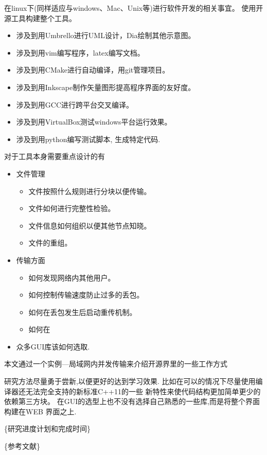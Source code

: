 \documentclass{data/hbue}
\begin{document}
\reportcontent
{
在linux下(同样适应与windows、Mac、Unix等)进行软件开发的相关事宜。
使用开源工具构建整个工具。
\begin{itemize}
	\item 涉及到用Umbrello进行UML设计，Dia绘制其他示意图。
	\item 涉及到用vim编写程序，latex编写文档。
	\item 涉及到用CMake进行自动编译，用git管理项目。
	\item 涉及到用Inkscape制作矢量图形提高程序界面的友好度。
	\item 涉及到用GCC进行跨平台交叉编译。
	\item 涉及到用VirtualBox测试windows平台运行效果。
	\item 涉及到用python编写测试脚本, 生成特定代码.
\end{itemize}

对于工具本身需要重点设计的有
\begin{itemize}
	\item 文件管理
		\begin{itemize}
			\item 文件按照什么规则进行分块以便传输。
			\item 文件如何进行完整性检验。
			\item 文件信息如何组织以便其他节点知晓。
			\item 文件的重组。
		\end{itemize}
	\item 传输方面
		\begin{itemize}
			\item 如何发现网络内其他用户。
			\item 如何控制传输速度防止过多的丢包。
			\item 如何在丢包发生后启动重传机制。
			\item 如何在
		\end{itemize}
	\item 众多GUI库该如何选取.
\end{itemize}

}

\reportschedule
{
本文通过一个实例---局域网内并发传输来介绍开源界里的一些工作方式

研究方法尽量勇于尝新,以便更好的达到学习效果.
比如在可以的情况下尽量使用编译器还无法完全支持的新标准C++11的一些
新特性来使代码结构更加简单更少的依赖第三方块。
在GUI的选型上也不没有选择自己熟悉的一些库,而是将整个界面构建在WEB
界面之上.

\{研究进度计划和完成时间\}
}

\reportreference
{
\{参考文献\}
}

\reportsuggestion
{
}


\end{document}

